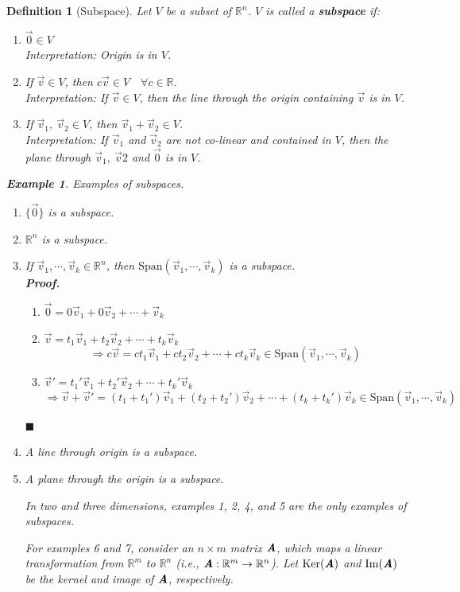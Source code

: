 \documentclass[12pt, a4paper]{article}
\newtheorem{df}{Definition}[subsection]
\newtheorem{eg}{Example}[subsection]
\newenvironment*{prf}{\indent\textbf{\textit{Proof. }}}{\hfill $\blacksquare$\par}
\def\R{{\mathbb{R}}}
\def\IM{{\mathrm{Im}}}
\def\Span{\mathrm{Span}}
\def\Ker{\mathrm{Ker}}
\def\vecv{\vec{v}}
\def\matrixA{\textbf{\emph{A}}}
\begin{document}
\begin{df}[Subspace]
	Let $V$ be a subset of $\R^n$. $V$ is called	 a \textbf{subspace} if: 
	\begin{enumerate}
		\item $\vec{0}\in V$\\
		Interpretation: Origin is in $V$.
		\item If $\vecv\in V$, then $c\vecv\in V\quad\forall c\in\R$.\\
		Interpretation: If $\vecv\in V$, then the line through the origin containing $\vecv$ is in $V$.
		\item If $\vecv_1,\ \vecv_2\in V$, then $\vecv_1+\vecv_2\in V$.\\
		Interpretation: If $\vecv_1$ and $\vecv_2$ are not co-linear and contained in $V$, then the plane through $\vecv_1,\ \vecv2$ and $\vec{0}$ is in $V$. 
	\end{enumerate}
	\begin{eg}
	Examples of subspaces. 
	\begin{enumerate}
		\item $\{\vec{0}\}$ is a subspace.
		\item $\R^n$ is a subspace.
		\item If $\vecv_1,\cdots,\vecv_k\in\R^n$, then $\Span(\vecv_1,\cdots,\vecv_k)$ is a subspace. \\
		\begin{prf}
			\begin{enumerate}
				\item $\vec{0}=0\vecv_1+0\vecv_2+\cdots+\vecv_k$
				\item $\vecv=t_1\vecv_1+t_2\vecv_2+\cdots+t_k\vecv_k$\[\Longrightarrow c\vecv=ct_1\vecv_1+ct_2\vecv_2+\cdots+ct_k\vecv_k\in\Span(\vecv_1,\cdots,\vecv_k)\]
				\item $\vecv'=t_1'\vecv_1+t_2'\vecv_2+\cdots+t_k'\vecv_k$\[\Longrightarrow \vecv+\vecv'=(t_1+t_1')\vecv_1+(t_2+t_2')\vecv_2+\cdots+(t_k+t_k')\vecv_k\in\Span(\vecv_1,\cdots,\vecv_k)\]
			\end{enumerate}	
		\end{prf}
		\item A line through origin is a subspace.
		\item A plane through the origin is a subspace.
		\begin{tcolorbox}
			In two and three dimensions, examples 1, 2, 4, and 5 are the only examples of subspaces.	
		\end{tcolorbox}
		For examples 6 and 7, consider an $n\times m$ matrix $\matrixA$, which maps a linear transformation from $\R^m$ to $\R^n$ (i.e., $\matrixA:\R^m\to\R^n$). Let $\Ker(\matrixA)$ and $\IM(\matrixA)$ be the kernel and image of $\matrixA$, respectively. 

\end{enumerate}
\end{eg}
\end{df}
\end{document}
